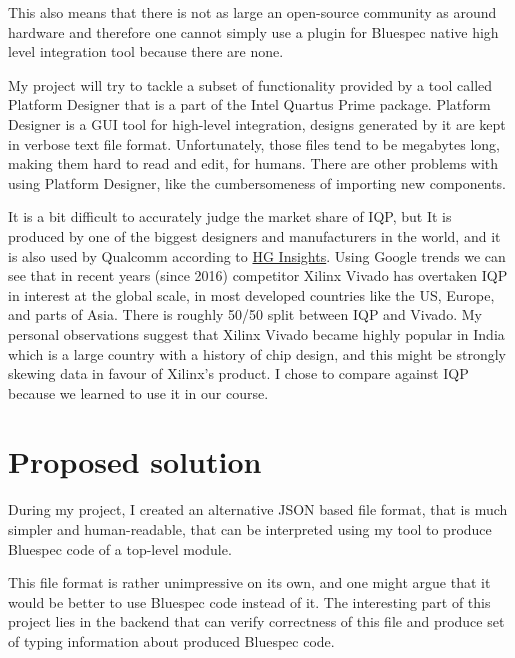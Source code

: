 \documentclass[12pt]{report}
\begin{document}
This also means that there is not as large an open-source community as around hardware and therefore one cannot simply use a plugin for Bluespec native high level integration tool because there are none. 

My project will try to tackle a subset of functionality provided by a tool called Platform Designer that is a part of the Intel Quartus Prime package. 
Platform Designer is a GUI tool for high-level integration, designs generated by it are kept in verbose text file format. Unfortunately, those files tend to be megabytes long, making them hard to read and edit, for humans. 
There are other problems with using Platform Designer, like the cumbersomeness of importing new components.

\begin{tcolorbox}[title=Market share and justification for focusing entirely on comparisons with Intel Quartus Prime]
    It is a bit difficult to accurately judge the market share of IQP, but It is produced by one of the biggest designers and manufacturers in the world, and it is also used by Qualcomm according to \href{https://discovery.hgdata.com/product/intel-quartus-prime}{HG Insights}. Using Google trends we can see that in recent years (since 2016) competitor Xilinx Vivado has overtaken IQP in interest at the global scale, in most developed countries like the US, Europe, and parts of Asia. There is roughly 50/50 split between IQP and Vivado. My personal observations suggest that Xilinx Vivado became highly popular in India which is a large country with a history of chip design, and this might be strongly skewing data in favour of Xilinx's product. I chose to compare against IQP because we learned to use it in our course.
\end{tcolorbox}

\section{Proposed solution}
During my project, I created an alternative JSON based file format, that is much simpler and human-readable, that can be interpreted using my tool to produce Bluespec code of a top-level module.  

This file format is rather unimpressive on its own, and one might argue that it would be better to use Bluespec code instead of it. The interesting part of this project lies in the backend that can verify correctness of this file and produce set of typing information about produced Bluespec code.  
\end{document}
